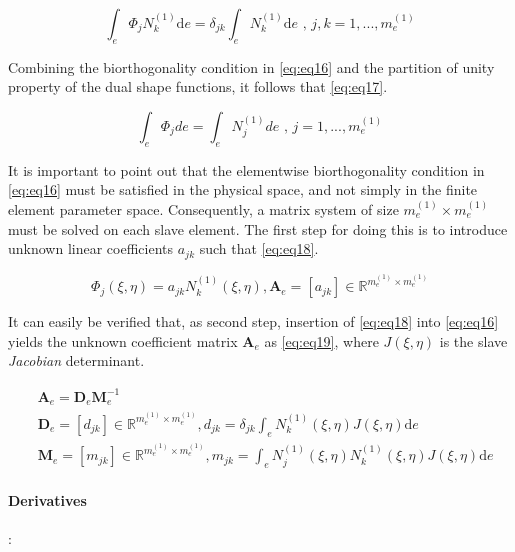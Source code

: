 \documentclass[a4paper,10pt]{article} %
\begin{document}
\begin{equation}\label{eq:eq16}
    \int_{e}\Phi_j N_k^{(1)} \text{d}e = \delta_{jk} \int_{e} N_k^{(1)} \text{d}e \text{ , } j,k=1,...,m_e^{(1)}
\end{equation}

Combining the biorthogonality condition in \eqref{eq:eq16} and the partition of unity property of the dual shape functions, it follows that \eqref{eq:eq17}.

\begin{equation}\label{eq:eq17}
    \int_e \Phi_j de =  \int_e N_j^{(1)} de \text{ , } j=1,...,m_e^{(1)}
\end{equation}

It is important to point out that the elementwise biorthogonality condition in \eqref{eq:eq16} must be satisfied in the physical space, and not simply in the finite element parameter space. Consequently, a matrix system of size $m_e^{(1)} \times m_e^{(1)}$ must be solved on each slave element. The first step for doing this is to introduce unknown linear coefficients $a_{jk}$ such that \eqref{eq:eq18}.

\begin{equation}\label{eq:eq18}
    \Phi_j(\xi, \eta) = a_{jk} N_k^{(1)}\left(\xi, \eta \right), \mathbf{A}_e = [a_{jk}] \in \mathbb{R}^{m_e^{(1)} \times m_e^{(1)}}
\end{equation}
 
 It can easily be verified that, as second step, insertion of \eqref{eq:eq18} into \eqref{eq:eq16} yields the unknown
coefficient matrix $\mathbf{A}_e$ as \eqref{eq:eq19}, where $J(\xi, \eta)$ is the slave \textit{Jacobian} determinant.

\begin{equation}\label{eq:eq19}
    \begin{aligned}
        & \mathbf{A}_e = \mathbf{D}_e\mathbf{M}_e^{-1} \\
        & \mathbf{D}_e = [d_{jk}] \in \mathbb{R}^{m_e^{(1)} \times m_e^{(1)}}, d_{jk} = \delta_{jk} \int_e N_k^{(1)}(\xi, \eta) J(\xi, \eta) \text{d}e \\
        & \mathbf{M}_e = [m_{jk}] \in \mathbb{R}^{m_e^{(1)} \times m_e^{(1)}}, m_{jk} = \int_e N_j^{(1)}(\xi, \eta) N_k^{(1)}(\xi, \eta) J(\xi, \eta) \text{d}e
    \end{aligned}
\end{equation}

\paragraph{Derivatives}:
\end{document}
